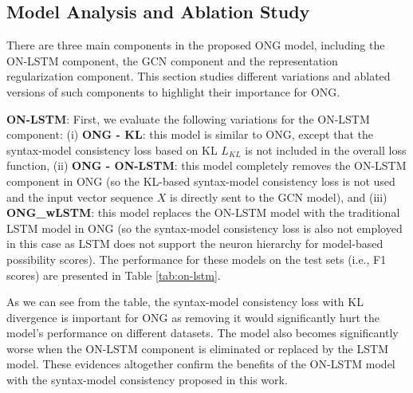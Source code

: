 \documentclass[11pt,a4paper]{article}
\begin{document}
\subsection{Model Analysis and Ablation Study}

There are three main components in the proposed ONG model, including the ON-LSTM component, the GCN component and the representation regularization component. This section studies different variations and ablated versions of such components to highlight their importance for ONG.





{\bf ON-LSTM}: First, we evaluate the following variations for the ON-LSTM component: (i) {\bf ONG - KL}: this model is similar to ONG, except that the syntax-model consistency loss based on KL $L_{KL}$ is not included in the overall loss function, (ii) {\bf ONG - ON-LSTM}: this model completely removes the ON-LSTM component in ONG (so the KL-based syntax-model consistency loss is not used and the input vector sequence $X$ is directly sent to the GCN model), and (iii) {\bf ONG\_wLSTM}: this model replaces the ON-LSTM model with the traditional LSTM model in ONG (so the syntax-model consistency loss is also not employed in this case as LSTM does not support the neuron hierarchy for model-based possibility scores). The performance for these models on the test sets (i.e., F1 scores) are presented in Table \ref{tab:on-lstm}.

\begin{table}[ht]
\centering
    \caption{Performance of the ON-LSTM's variations.}
    \label{tab:on-lstm}
\end{table}
As we can see from the table, the syntax-model consistency loss with KL divergence is important for ONG as removing it would significantly hurt the model's performance on different datasets. The model also becomes significantly worse when the ON-LSTM component is eliminated or replaced by the LSTM model. These evidences altogether confirm the benefits of the ON-LSTM model with the syntax-model consistency proposed in this work.
\end{document}
